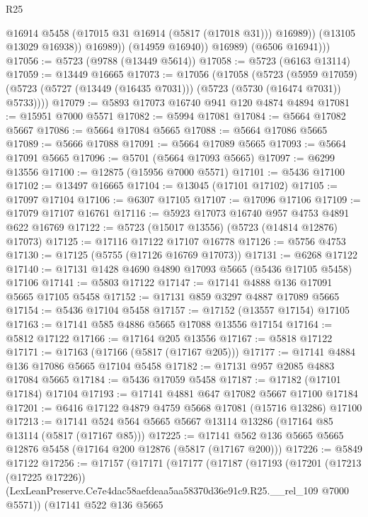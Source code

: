 \begin{lexlean}{R25}
\begin{coremodule}
                      @16914
                      @5458
                      (@17015 @31 @16914 (@5817 (@17018 @31)))
                      @16989))
                  (@13105 @13029 @16938))
                @16989))
            (@14959 @16940))
          @16989)
        (@6506 @16941)))
@17056 := @5723 (@9788 (@13449 @5614))
@17058 := @5723 (@6163 @13114)
@17059 := @13449 @16665
@17073 := @17056
    (@17058
      (@5723
        (@5959 @17059)
        (@5723 (@5727 (@13449 (@16435 @7031))) (@5723 (@5730 (@16474 @7031)) @5733))))
@17079 := @5893 @17073 @16740 @941 @120 @4874 @4894
@17081 := @15951 @7000 @5571
@17082 := @5994 @17081
@17084 := @5664 @17082 @5667
@17086 := @5664 @17084 @5665
@17088 := @5664 @17086 @5665
@17089 := @5666 @17088
@17091 := @5664 @17089 @5665
@17093 := @5664 @17091 @5665
@17096 := @5701 (@5664 @17093 @5665)
@17097 := @6299 @13556
@17100 := @12875 (@15956 @7000 @5571)
@17101 := @5436 @17100
@17102 := @13497 @16665
@17104 := @13045 (@17101 @17102)
@17105 := @17097 @17104
@17106 := @6307 @17105
@17107 := @17096 @17106
@17109 := @17079 @17107 @16761
@17116 := @5923 @17073 @16740 @957 @4753 @4891 @622 @16769
@17122 := @5723 (@15017 @13556) (@5723 (@14814 @12876) @17073)
@17125 := @17116 @17122 @17107 @16778
@17126 := @5756 @4753
@17130 := @17125 (@5755 (@17126 @16769 @17073))
@17131 := @6268 @17122
@17140 := @17131 @1428 @4690 @4890 @17093 @5665 (@5436 @17105 @5458) @17106
@17141 := @5803 @17122
@17147 := @17141 @4888 @136 @17091 @5665 @17105 @5458
@17152 := @17131 @859 @3297 @4887 @17089 @5665
@17154 := @5436 @17104 @5458
@17157 := @17152 (@13557 @17154) @17105
@17163 := @17141 @585 @4886 @5665 @17088 @13556 @17154
@17164 := @5812 @17122
@17166 := @17164 @205 @13556
@17167 := @5818 @17122
@17171 := @17163 (@17166 (@5817 (@17167 @205)))
@17177 := @17141 @4884 @136 @17086 @5665 @17104 @5458
@17182 := @17131 @957 @2085 @4883 @17084 @5665
@17184 := @5436 @17059 @5458
@17187 := @17182 (@17101 @17184) @17104
@17193 := @17141 @4881 @647 @17082 @5667 @17100 @17184
@17201 := @6416 @17122 @4879 @4759 @5668 @17081 (@15716 @13286) @17100
@17213 := @17141 @524 @564 @5665 @5667 @13114 @13286 (@17164 @85 @13114 (@5817 (@17167 @85)))
@17225 := @17141 @562 @136 @5665 @5665 @12876 @5458 (@17164 @200 @12876 (@5817 (@17167 @200)))
@17226 := @5849 @17122
@17256 := @17157
    (@17171
      (@17177
        (@17187
          (@17193
            (@17201
              (@17213 (@17225 @17226))
              (LexLeanPreserve.Ce7e4dac58aefdeaa5aa58370d36e91c9.R25.__rel_109 @7000 @5571))
            (@17141
              @522
              @136
              @5665

\end{coremodule}
\end{lexlean}

